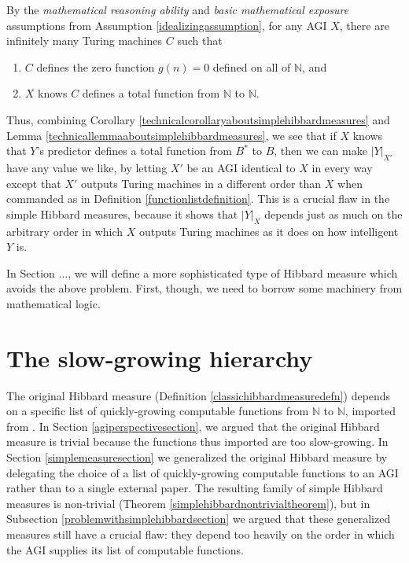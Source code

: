 \documentclass{article}
\begin{document}
By the \emph{mathematical reasoning ability} and \emph{basic mathematical
exposure} assumptions from Assumption \ref{idealizingassumption},
for any AGI $X$, there are infinitely many Turing machines $C$ such that
\begin{enumerate}
    \item
    $C$ defines the zero function $g(n)=0$ defined on all of $\mathbb N$, and
    \item
    $X$ knows $C$ defines a total function from $\mathbb N$ to $\mathbb N$.
\end{enumerate}
Thus, combining Corollary \ref{technicalcorollaryaboutsimplehibbardmeasures}
and Lemma \ref{technicallemmaaboutsimplehibbardmeasures},
we see that if $X$ knows that $Y$'s predictor defines a total function
from $B^*$ to $B$, then we can make $|Y|_{X'}$ have any value we like,
by letting $X'$ be an AGI identical to $X$ in every way except that
$X'$ outputs Turing machines in a different order than $X$ when commanded
as in Definition \ref{functionlistdefinition}.
This is a crucial flaw in the simple Hibbard measures, because it shows
that $|Y|_X$ depends just as much on the arbitrary order in which $X$
outputs Turing machines as it does on how intelligent $Y$ is.

In Section ..., we will define a more sophisticated type of Hibbard measure
which avoids the above problem. First, though, we need to borrow some machinery
from mathematical logic.

\section{The slow-growing hierarchy}
\label{slowgrowinghierarchysection}

The original Hibbard measure
(Definition \ref{classichibbardmeasuredefn}) depends on a specific list of
quickly-growing computable functions from $\mathbb N$ to $\mathbb N$, imported from
\cite{liu1960enumeration}. In Section \ref{agiperspectivesection}, we argued
that the original Hibbard measure is trivial because the functions thus imported
are too slow-growing.
In Section \ref{simplemeasuresection} we generalized
the original Hibbard measure
by delegating the choice of a list of quickly-growing computable functions to an AGI rather
than to a single external paper. The resulting family of simple Hibbard measures is
non-trivial (Theorem \ref{simplehibbardnontrivialtheorem}), but in
Subsection \ref{problemwithsimplehibbardsection} we argued that these generalized
measures still have a crucial flaw: they depend too heavily on the order in which
the AGI supplies its list of computable functions.
\end{document}
